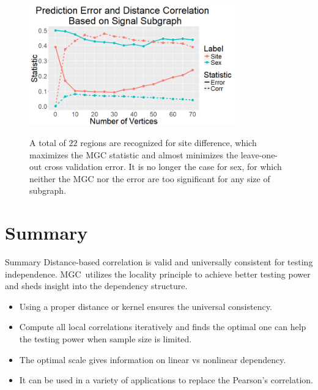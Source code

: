 \documentclass[mathserif,t]{beamer}
\newcommand{\Mgc}{MGC}
\begin{document}
\begin{frame}
\begin{figure}[!ht]
	\centering
	\includegraphics[width=3.5in]{batch_sex_cor_error.png}
	\label{fig:study}
	\caption{A total of $22$ regions are recognized for site difference, which maximizes the MGC statistic and almost minimizes the leave-one-out cross validation error. It is no longer the case for sex, for which neither the MGC nor the error are too significant for any size of subgraph.}
\end{figure}
\end{frame}

\section{Summary}
\begin{frame}{Summary}
\pause
Distance-based correlation is valid and universally consistent for testing independence. \Mgc~utilizes the locality principle to achieve better testing power and sheds insight into the dependency structure.

\pause
\medskip
\begin{itemize}[<+->]
\item Using a proper distance or kernel ensures the universal consistency.
\item Compute all local correlations iteratively and finds the optimal one can help the testing power when sample size is limited.
\item The optimal scale gives information on linear vs nonlinear dependency.
\item It can be used in a variety of applications to replace the Pearson's correlation.
\end{itemize}
\end{frame}
\end{document}
